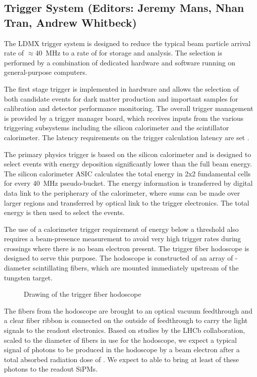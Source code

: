 
\subsection{Trigger System (Editors: Jeremy Mans, Nhan Tran, Andrew Whitbeck)}

The LDMX trigger system is designed to reduce the typical beam
particle arrival rate of $\approx 40$~MHz to a rate of  for
storage and analysis.  The selection is performed by a combination of
dedicated hardware and software running on general-purpose computers.

The first stage trigger is implemented in hardware and allows the
selection of both candidate events for dark matter production and
important samples for calibration and detector performance monitoring.
The overall trigger management is provided by a trigger manager board,
which receives inputs from the various triggering subsystems including
the silicon calorimeter and the scintillator calorimeter.  The latency
requirements on the trigger calculation latency are set .

The primary physics trigger is based on the silicon calorimeter and is
designed to select events with energy deposition significantly lower
than the full beam energy.  The silicon calorimeter ASIC calculates
the total energy in 2x2 fundamental cells for every 40~MHz
pseudo-bucket.  The energy information is transferred by digital data
link to the peripherary of the calorimeter, where sums can be made
over larger regions and transferred by optical link to the trigger
electronics.  The total energy is then used to select the events.

The use of a calorimeter trigger requirement of energy below a
threshold also requires a beam-presence measurement to avoid very high
trigger rates during crossings where there is no beam electron
present.  The trigger fiber hodoscope is designed to serve this
purpose.  The hodoscope is constructed of an array of -diameter
scintillating fibers, which are mounted immediately upstream of the
tungsten target. 

\begin{figure}[t]
  \caption{Drawing of the trigger fiber hodoscope}
\end{figure}

The fibers from the hodoscope are brought to an optical vacuum
feedthrough and a clear fiber ribbon is connected on the outside of
feedthrough to carry the light signals to the readout electronics.
Based on studies by the LHCb collaboration\cite{lhcb:scintfiberrad},
scaled to the diameter of fibers in use for the hodoscope, we expect a
typical signal of \draft{[]} photons to be produced in the hodoscope by a beam
electron after a total absorbed radiation dose of .
We expect to able to bring at least \draft{[50\%]} of these photons
to the readout SiPMs.

